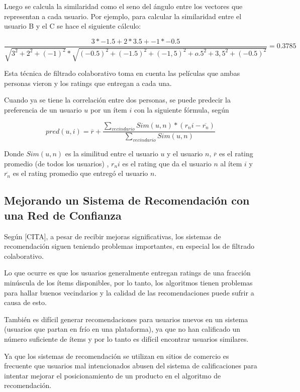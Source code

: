 Luego se calcula la similaridad como el seno del ángulo entre los vectores que representan a cada usuario. Por ejemplo, para calcular la similaridad entre el usuario B y el C se hace el siguiente cálculo:

\begin{equation}
\frac{3*-1.5 + 2*3.5+-1*-0.5}{\sqrt{3^2+2^2+(-1)^2}*\sqrt{(-0.5)^2+(-1.5)^2+(-1,5)^2+o.5^2+3,5^2+(-0.5)^2}}  = 0.3785
\end{equation}

Esta técnica de filtrado colaborativo toma en cuenta las películas que ambas personas vieron y los ratings que entregan a cada una.

Cuando ya se tiene la correlación entre dos personas, se puede predecir la preferencia de un usuario $u$ por un ítem $i$ con la siguiente fórmula, según \cite{Girgin}

\begin{equation}
pred(u,i) = \overline{r} + \frac{\sum\limits_{vecindario} Sim(u,n) * (r_ni - \overline{r_n} )}{\sum\limits_{vecindario} Sim(u,n)}
\end{equation}

Donde $Sim(u,n)$ es la similitud entre el usuario $u$ y el usuario $n$, $\overline{r}$ es el rating promedio (de todos los usuarios) , $r_ni$ es el rating que da el usuario $n$ al ítem $i$ y $\overline{r_n}$ es el rating promedio que entregó el usuario $n$.  

\subsection{Mejorando un Sistema de Recomendación con una Red de Confianza}

Según [CITA], a pesar de recibir mejoras significativas, los sistemas de recomendación siguen teniendo problemas importantes, en especial los de filtrado colaborativo. 



Lo que ocurre es que los usuarios generalmente entregan ratings de una fracción minúscula de los ítems disponibles, por lo tanto, los algoritmos tienen problemas para hallar buenos vecindarios y la calidad de las recomendaciones puede sufrir a causa de esto. 

También es difícil generar recomendaciones para usuarios nuevos en un sistema (usuarios que partan en frío en una plataforma),  ya que no han calificado un número suficiente de ítems y por lo tanto es difícil encontrar usuarios similares.

Ya que los sistemas de recomendación se utilizan en sitios de comercio es frecuente que usuarios mal intencionados abusen del sistema de calificaciones para intentar mejorar el posicionamiento de un producto en el algoritmo de recomendación.


